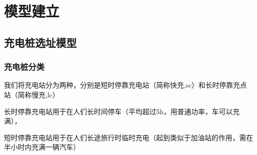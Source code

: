 \documentclass[12pt, a4paper, oneside]{ctexart}
\begin{document}
    \section{模型建立}
    \subsection{充电桩选址模型}
    \subsubsection{充电桩分类}
        我们将充电站分为两种，分别是短时停靠充电站（简称快充,sc）和长时停靠充点站（简称慢充,lc）

        长时停靠充电站用于在人们长时间停车（平均超过5h，用普通功率，车可以充满），

        短时停靠充电站用于在人们长途旅行时临时充电（起到类似于加油站的作用，需在半小时内充满一辆汽车）
\end{document}
